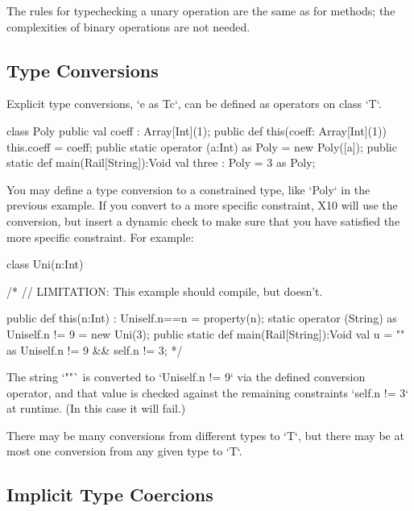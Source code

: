 The rules for typechecking a unary operation are the same as for methods; the
complexities of binary operations are not needed.



\subsection{Type Conversions}

Explicit type conversions, \xcd`e as T{c}`, can be defined as operators on
class \xcd`T`.

\begin{xten}
class Poly {
  public val coeff : Array[Int](1);
  public def this(coeff: Array[Int](1)) { this.coeff = coeff;}
  public static operator (a:Int) as Poly = new Poly([a]);
  public static def main(Rail[String]):Void {
     val three : Poly = 3 as Poly;
  }
}
\end{xten}
%



You may define a type conversion to a constrained type, like \xcd`Poly` in
the previous example.   If you convert to a more specific constraint, X10 will use
the conversion, but insert a dynamic check to make sure that you have
satisfied the more specific constraint.  
For example: 
\begin{xten}
class Uni(n:Int) {
/*
//  LIMITATION: This example should compile, but doesn't.

  public def this(n:Int) : Uni{self.n==n} = {property(n);}
  static operator (String) as Uni{self.n != 9} = new Uni(3);
  public static def main(Rail[String]):Void {
    val u = "" as Uni{self.n != 9 && self.n != 3};
  }
*/
}
\end{xten}
%
The string \xcd`""` is converted to \xcd`Uni{self.n != 9}` via the defined
conversion operator, and that value is checked against the remaining
constraints \xcd`{self.n != 3}` at runtime.  (In this case it will fail.)

There may be many conversions from different types to \xcd`T`, but there may
be at most one conversion from any given type to \xcd`T`. 


\subsection{Implicit Type Coercions}

